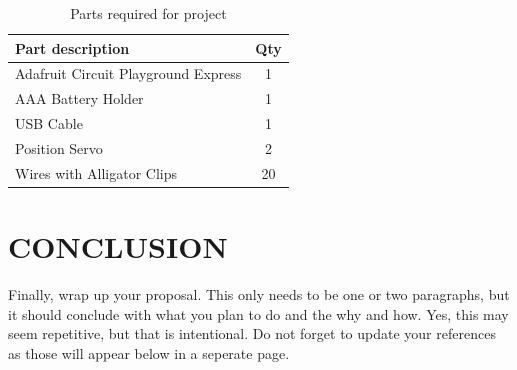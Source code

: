 \documentclass[12pt]{article}
\begin{document}
\begin{table}[ht]
  \caption{Parts required for project}
  \label{table:parts_list}
  \begin{center}
  \begin{tabular}{|p{3in}|c|}
  
  \hline
  Part description & Qty\\
  \hline
  \hline
  Adafruit Circuit Playground Express & 1 \\
  \hline
  AAA Battery Holder & 1 \\
  \hline
  USB Cable & 1 \\
  \hline
  Position Servo & 2\\
  \hline 
  Wires with Alligator Clips & 20\\
  \hline
 
  
  \end{tabular}
  \end{center}
  \end{table}


\newpage

\section{CONCLUSION}
Finally, wrap up your proposal. This only needs to be one or two paragraphs, but it should conclude with what you plan to do and the why and how. Yes, this may seem repetitive, 
but that is intentional. Do not forget to update your references as those will appear below in a seperate page.



\newpage
\printbibliography[heading=subbibintoc]
%
%
\end{document}
